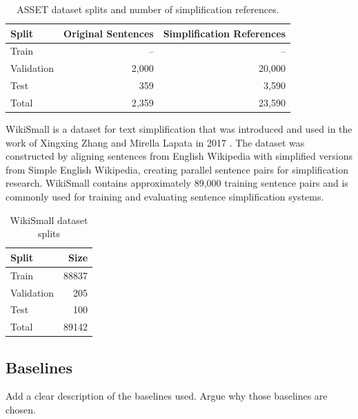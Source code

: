 \documentclass[sigconf, review, nonacm]{acmart}
\begin{document}
\begin{table}[h]
\centering
\begin{tabular}{lrr}
\hline
\textbf{Split} & \textbf{Original Sentences} & \textbf{Simplification References} \\
\hline
Train      & --    & --     \\
Validation & 2,000 & 20,000 \\
Test       & 359   & 3,590  \\
\hline
Total      & 2,359 & 23,590 \\
\hline
\end{tabular}
\caption{ASSET dataset splits and number of simplification references.}
\label{tab:asset}
\end{table}


WikiSmall is a dataset for text simplification that was introduced and used in the work of Xingxing Zhang and Mirella Lapata in 2017 . The dataset was constructed by aligning sentences from English Wikipedia with simplified versions from Simple English Wikipedia, creating parallel sentence pairs for simplification research. WikiSmall contains approximately 89,000 training sentence pairs and is commonly used for training and evaluating sentence simplification systems. 

\begin{table}[h]
\centering
\begin{tabular}{lr}
\hline
\textbf{Split} & Size\\
\hline
Train      & 88837\\
Validation & 205\\
Test       & 100\\
\hline
Total      & 89142\\
\hline
\end{tabular}
\caption{WikiSmall dataset splits}
\end{table}



\label{sec:preprocessing}


\subsection{Baselines}

Add a clear description of the baselines used.
Argue why those baselines are chosen.
\end{document}
